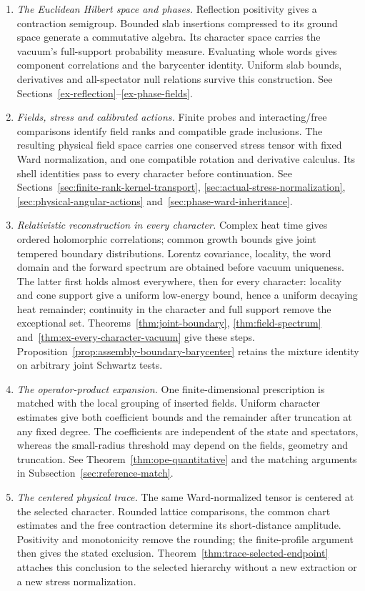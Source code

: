 \begin{enumerate}
\item \emph{The Euclidean Hilbert space and phases.}
Reflection positivity gives a contraction semigroup. Bounded slab
insertions compressed to its ground space generate a commutative algebra.
Its character space carries the vacuum's full-support probability
measure. Evaluating whole words gives component correlations and the
barycenter identity. Uniform slab bounds, derivatives and all-spectator
null relations survive this construction. See
Sections~\ref{ex-reflection}--\ref{ex-phase-fields}.

\item \emph{Fields, stress and calibrated actions.}
Finite probes and interacting/free comparisons identify field ranks and
compatible grade inclusions. The resulting physical field space carries
one conserved stress tensor with fixed Ward normalization, and one
compatible rotation and derivative calculus. Its shell identities pass
to every character before continuation. See
Sections~\ref{sec:finite-rank-kernel-transport},
\ref{sec:actual-stress-normalization},
\ref{sec:physical-angular-actions} and~\ref{sec:phase-ward-inheritance}.

\item \emph{Relativistic reconstruction in every character.}
Complex heat time gives ordered holomorphic correlations; common growth
bounds give joint tempered boundary distributions. Lorentz covariance,
locality, the word domain and the forward spectrum are obtained before
vacuum uniqueness. The latter first holds almost everywhere, then for
every character: locality and cone support give a uniform low-energy
bound, hence a uniform decaying heat remainder; continuity in the
character and full support remove the exceptional set.
Theorems~\ref{thm:joint-boundary}, \ref{thm:field-spectrum}
and~\ref{thm:ex-every-character-vacuum} give these steps.
Proposition~\ref{prop:assembly-boundary-barycenter} retains the mixture
identity on arbitrary joint Schwartz tests.

\item \emph{The operator-product expansion.}
One finite-dimensional prescription is matched with the local grouping
of inserted fields. Uniform character estimates give both coefficient
bounds and the remainder after truncation at any fixed degree. The
coefficients are independent of the state and spectators, whereas the
small-radius threshold may depend on the fields, geometry and truncation.
See Theorem~\ref{thm:ope-quantitative} and the matching arguments in
Subsection~\ref{sec:reference-match}.

\item \emph{The centered physical trace.}
The same Ward-normalized tensor is centered at the selected character.
Rounded lattice comparisons, the common chart estimates and the
free contraction determine its short-distance amplitude. Positivity and
monotonicity remove the rounding; the finite-profile argument then gives
the stated exclusion. Theorem~\ref{thm:trace-selected-endpoint}
attaches this conclusion to the selected hierarchy without a new
extraction or a new stress normalization.
\end{enumerate}

